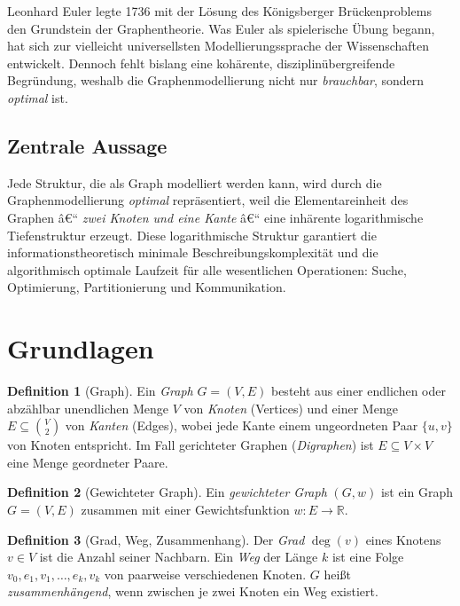 ﻿\documentclass[12pt,a4paper,twoside]{article}
\theoremstyle{definition}
\newtheorem{definition}{Definition}[section]
\theoremstyle{plain}
\theoremstyle{remark}
\begin{document}
Leonhard Euler legte 1736 mit der Lösung des Königsberger
Brückenproblems den Grundstein der Graphentheorie.  Was Euler
als spielerische Übung begann, hat sich zur vielleicht
universellsten Modellierungssprache der Wissenschaften entwickelt.
Dennoch fehlt bislang eine kohärente, disziplinübergreifende
Begründung, weshalb die Graphenmodellierung nicht nur
\emph{brauchbar}, sondern \emph{optimal} ist.

\subsection{Zentrale Aussage}

Jede Struktur, die als Graph modelliert werden
kann, wird durch die Graphenmodellierung \emph{optimal} repräsentiert,
weil die Elementareinheit des Graphen â€“ \emph{zwei Knoten und eine
Kante} â€“ eine inhärente logarithmische Tiefenstruktur erzeugt.
Diese logarithmische Struktur garantiert die informationstheoretisch
minimale Beschreibungskomplexität und die algorithmisch optimale
Laufzeit für alle wesentlichen Operationen: Suche, Optimierung,
Partitionierung und Kommunikation.

\section{Grundlagen}
\label{sec:grundlagen}

\begin{definition}[Graph]
Ein \emph{Graph} $G = (V, E)$ besteht aus einer endlichen oder
abzählbar unendlichen Menge $V$ von \emph{Knoten} (Vertices) und
einer Menge $E \subseteq \binom{V}{2}$ von \emph{Kanten} (Edges),
wobei jede Kante einem ungeordneten Paar $\{u,v\}$ von Knoten
entspricht.  Im Fall gerichteter Graphen (\emph{Digraphen}) ist
$E \subseteq V \times V$ eine Menge geordneter Paare.
\end{definition}

\begin{definition}[Gewichteter Graph]
Ein \emph{gewichteter Graph} $(G, w)$ ist ein Graph $G=(V,E)$
zusammen mit einer Gewichtsfunktion $w: E \to \mathbb{R}$.
\end{definition}

\begin{definition}[Grad, Weg, Zusammenhang]
Der \emph{Grad} $\deg(v)$ eines Knotens $v \in V$ ist die Anzahl
seiner Nachbarn.  Ein \emph{Weg} der Länge $k$ ist eine Folge
$v_0, e_1, v_1, \ldots, e_k, v_k$ von paarweise verschiedenen
Knoten.  $G$ heißt \emph{zusammenhängend}, wenn zwischen je zwei
Knoten ein Weg existiert.
\end{definition}
\end{document}
